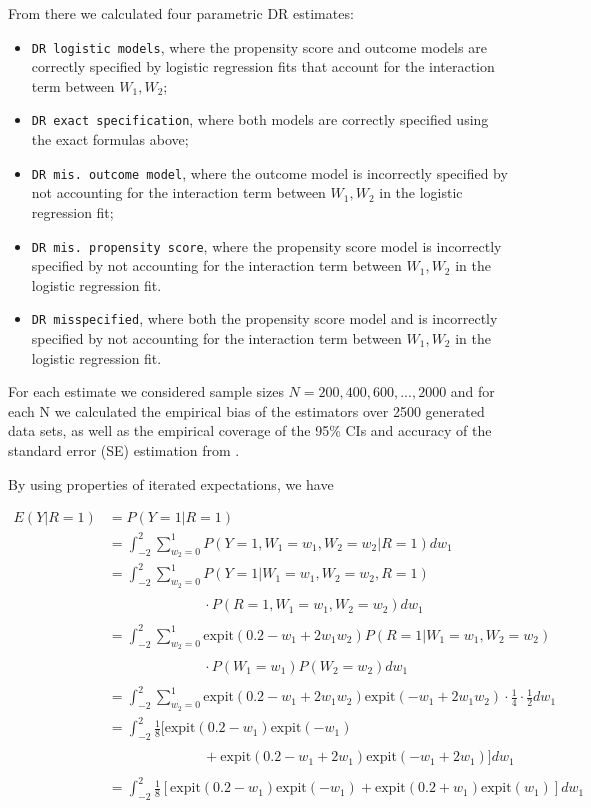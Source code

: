 \documentclass[12pt,twoside]{article}
\newcommand{\expit}{\text{expit}}
\begin{document}
From there we calculated four parametric DR estimates: 
\begin{itemize}
    \item \texttt{DR logistic models}, where the propensity score and outcome models are correctly specified by logistic regression fits that account for the interaction term between $W_1, W_2$;
    \item \texttt{DR exact specification}, where both models are correctly specified using the exact formulas above;
    \item \texttt{DR mis. outcome model}, where the outcome model is incorrectly specified by not accounting for the interaction term between $W_1, W_2$ in the logistic regression fit;
    \item \texttt{DR mis. propensity score}, where the propensity score model is incorrectly specified by not accounting for the interaction term between $W_1, W_2$ in the logistic regression fit.
    \item \texttt{DR misspecified}, where both the propensity score model and is incorrectly specified by not accounting for the interaction term between $W_1, W_2$ in the logistic regression fit.
\end{itemize}

For each estimate we considered sample sizes $N = 200, 400, 600, ..., 2000$ and for each N we calculated the empirical bias of the estimators over 2500 generated data sets, as well as the empirical coverage of the 95\% CIs and accuracy of the standard error (SE) estimation from \citet{lunceford_davidian}.

By using properties of iterated expectations, we have

\begin{align*}
    E(Y|R = 1) &= P(Y = 1|R = 1)\\
    &= \int_{-2}^{2} \sum_{w_2 = 0}^{1} P(Y = 1, W_1 = w_1, W_2 = w_2|R = 1) dw_1 \\
    & = \int_{-2}^{2} \sum_{w_2 = 0}^{1} P(Y = 1|W_1 = w_1, W_2 = w_2, R = 1) \\
    & \phantom{ = \int_{-2}^{2} \sum_{w_2 = 0}^{1}} \cdot P(R = 1, W_1 = w_1, W_2 = w_2)dw_1 \\
    & = \int_{-2}^{2} \sum_{w_2 = 0}^{1} \expit(0.2 - w_1 + 2w_1w_2)P(R = 1|W_1 = w_1, W_2 = w_2) \\
    &\phantom{ = \int_{-2}^{2} \sum_{w_2 = 0}^{1}} \cdot P(W_1 = w_1)P(W_2 = w_2)dw_1 \\
    & = \int_{-2}^{2} \sum_{w_2 = 0}^{1} \expit(0.2 - w_1 + 2w_1w_2)\expit(-w_1+2w_1w_2) \cdot \frac{1}{4}\cdot \frac{1}{2}dw_1 \\
    & = \int_{-2}^{2} \frac{1}{8}[\expit(0.2 - w_1)\expit(-w_1) \\
    &\phantom{ = \int_{-2}^{2} \sum_{w_2 = 0}^{1}} +\expit(0.2 - w_1 + 2w_1)\expit(-w_1+2w_1)]dw_1 \\
    & = \int_{-2}^{2} \frac{1}{8}[\expit(0.2 - w_1)\expit(-w_1) +\expit(0.2 + w_1)\expit(w_1)]dw_1 \\
\end{align*}
\end{document}
